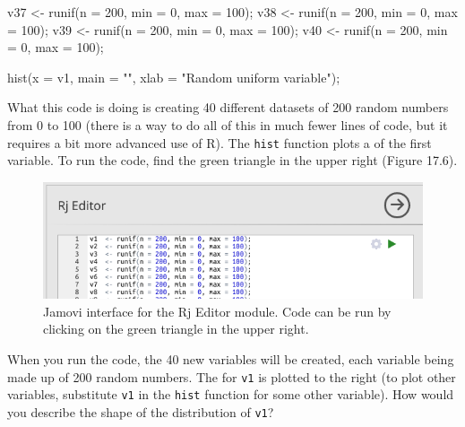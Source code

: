 \documentclass[
  openany]{krantz}
\makeatletter
\newenvironment{Shaded}{\begin{snugshade}}{\end{snugshade}}
\newcommand{\AttributeTok}[1]{\textcolor[rgb]{0.61,0.61,0.61}{#1}}
\newcommand{\DecValTok}[1]{\textcolor[rgb]{0.06,0.06,0.06}{#1}}
\newcommand{\FunctionTok}[1]{\textcolor[rgb]{0,0,0}{#1}}
\newcommand{\NormalTok}[1]{#1}
\newcommand{\OtherTok}[1]{\textcolor[rgb]{0.37,0.37,0.37}{#1}}
\newcommand{\StringTok}[1]{\textcolor[rgb]{0.5,0.5,0.5}{#1}}
\newenvironment{kframe}{%
\medskip{}
\setlength{\fboxsep}{.8em}
 \def\at@end@of@kframe{}%
 \ifinner\ifhmode%
  \def\at@end@of@kframe{\end{minipage}}%
  \begin{minipage}{\columnwidth}%
 \fi\fi%
 \def\FrameCommand##1{\hskip\@totalleftmargin \hskip-\fboxsep
 \colorbox{shadecolor}{##1}\hskip-\fboxsep
     \hskip-\linewidth \hskip-\@totalleftmargin \hskip\columnwidth}%
 \MakeFramed {\advance\hsize-\width
   \@totalleftmargin\z@ \linewidth\hsize
   \@setminipage}}%
 {\par\unskip\endMakeFramed%
 \at@end@of@kframe}
\renewenvironment{Shaded}{\begin{kframe}}{\end{kframe}}
\makeatother
\begin{document}
\begin{Shaded}
\begin{Highlighting}[]
\NormalTok{v37 }\OtherTok{\textless{}{-}} \FunctionTok{runif}\NormalTok{(}\AttributeTok{n =} \DecValTok{200}\NormalTok{, }\AttributeTok{min =} \DecValTok{0}\NormalTok{, }\AttributeTok{max =} \DecValTok{100}\NormalTok{);}
\NormalTok{v38 }\OtherTok{\textless{}{-}} \FunctionTok{runif}\NormalTok{(}\AttributeTok{n =} \DecValTok{200}\NormalTok{, }\AttributeTok{min =} \DecValTok{0}\NormalTok{, }\AttributeTok{max =} \DecValTok{100}\NormalTok{);}
\NormalTok{v39 }\OtherTok{\textless{}{-}} \FunctionTok{runif}\NormalTok{(}\AttributeTok{n =} \DecValTok{200}\NormalTok{, }\AttributeTok{min =} \DecValTok{0}\NormalTok{, }\AttributeTok{max =} \DecValTok{100}\NormalTok{);}
\NormalTok{v40 }\OtherTok{\textless{}{-}} \FunctionTok{runif}\NormalTok{(}\AttributeTok{n =} \DecValTok{200}\NormalTok{, }\AttributeTok{min =} \DecValTok{0}\NormalTok{, }\AttributeTok{max =} \DecValTok{100}\NormalTok{);}

\FunctionTok{hist}\NormalTok{(}\AttributeTok{x =}\NormalTok{ v1, }\AttributeTok{main =} \StringTok{""}\NormalTok{, }\AttributeTok{xlab =} \StringTok{"Random uniform variable"}\NormalTok{);}
\end{Highlighting}
\end{Shaded}

What this code is doing is creating 40 different datasets of 200 random numbers from 0 to 100 (there is a way to do all of this in much fewer lines of code, but it requires a bit more advanced use of R).
The \texttt{hist} function plots a  of the first variable.
To run the code, find the green triangle in the upper right (Figure 17.6).

\begin{figure}
\includegraphics[width=1\linewidth]{img/jamovi_RjEditor} \caption{Jamovi interface for the Rj Editor module. Code can be run by clicking on the green triangle in the upper right.}\label{fig:unnamed-chunk-72}
\end{figure}

When you run the code, the 40 new variables will be created, each variable being made up of 200 random numbers.
The  for \texttt{v1} is plotted to the right (to plot other variables, substitute \texttt{v1} in the \texttt{hist} function for some other variable).
How would you describe the shape of the distribution of \texttt{v1}?
\end{document}
